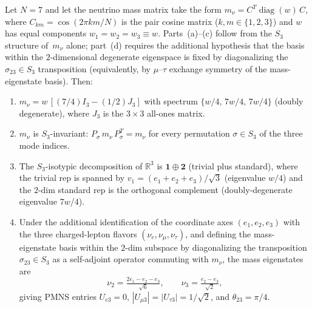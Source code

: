 \begin{theorem}
\label{thm:maximal-atm}
Let $N = 7$ and let the neutrino mass matrix take the form
$m_\nu = C^T\!\operatorname{diag}(w)\,C$,
where $C_{km} = \cos(2\pi km/N)$ is the pair cosine matrix
($k, m \in \{1, 2, 3\}$) and $w$ has equal
components $w_1 = w_2 = w_3 \equiv w$.
Parts~(a)--(c) follow from the $S_3$ structure of~$m_\nu$ alone;
part~(d) requires the additional hypothesis that the basis
within the $2$-dimensional degenerate eigenspace is fixed by
diagonalizing the $\sigma_{23} \in S_3$ transposition
(equivalently, by $\mu$--$\tau$ exchange symmetry
of the mass-eigenstate basis).
Then:
\begin{enumerate}
\item[\textup{(a)}] $m_\nu = w\,[(7/4)I_3 - (1/2)J_3]$
  with spectrum $\{w/4,\, 7w/4,\, 7w/4\}$
  (doubly degenerate), where $J_3$ is the $3{\times}3$
  all-ones matrix.
\item[\textup{(b)}] $m_\nu$ is $S_3$-invariant:
  $P_\sigma\,m_\nu\,P_\sigma^T = m_\nu$ for every permutation
  $\sigma \in S_3$ of the three mode indices.
\item[\textup{(c)}] The $S_3$-isotypic decomposition of
  $\mathbb{R}^3$ is $\mathbf{1} \oplus \mathbf{2}$
  (trivial plus standard), where the trivial rep is spanned
  by $v_1 = (e_1 + e_2 + e_3)/\sqrt{3}$ (eigenvalue $w/4$)
  and the $2$-dim standard rep is the orthogonal complement
  (doubly-degenerate eigenvalue $7w/4$).
\item[\textup{(d)}] Under the additional identification of the
  coordinate axes $(e_1, e_2, e_3)$ with the three charged-lepton
  flavors $(\nu_e, \nu_\mu, \nu_\tau)$, and defining the
  mass-eigenstate basis within the $2$-dim subspace by
  diagonalizing the transposition $\sigma_{23} \in S_3$ as
  a self-adjoint operator commuting with $m_\nu$, the mass
  eigenstates are
  \[
    \nu_2 = \tfrac{2e_1 - e_2 - e_3}{\sqrt{6}},
    \qquad
    \nu_3 = \tfrac{e_2 - e_3}{\sqrt{2}},
  \]
  giving PMNS entries
  $U_{e3} = 0$, $|U_{\mu 3}| = |U_{\tau 3}| = 1/\sqrt{2}$,
  and $\theta_{23} = \pi/4$.
\end{enumerate}
\end{theorem}
